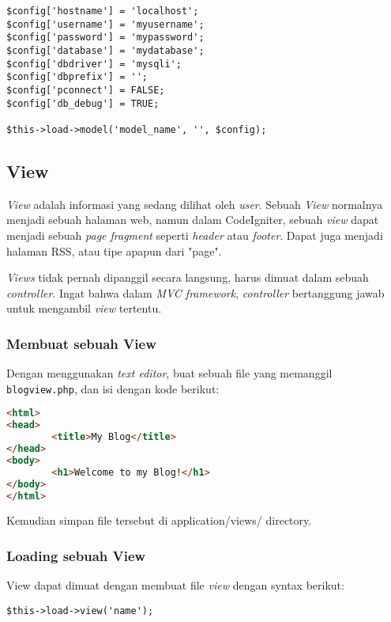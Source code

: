 \begin{enumerate}
\begin{lstlisting}[label=phpheg, frame=single]
$config['hostname'] = 'localhost';
$config['username'] = 'myusername';
$config['password'] = 'mypassword';
$config['database'] = 'mydatabase';
$config['dbdriver'] = 'mysqli';
$config['dbprefix'] = '';
$config['pconnect'] = FALSE;
$config['db_debug'] = TRUE;

$this->load->model('model_name', '', $config);
\end{lstlisting}


\subsection{View}
\label{subs:view}
\textit{View} adalah informasi yang sedang dilihat oleh \textit{user}. Sebuah \textit{View} normalnya menjadi sebuah halaman web, namun dalam CodeIgniter, sebuah \textit{view} dapat menjadi sebuah \textit{page fragment} seperti \textit{header} atau \textit{footer}. Dapat juga menjadi halaman RSS, atau tipe apapun dari "page".

\textit{Views} tidak pernah dipanggil secara langsung, harus dimuat dalam sebuah \textit{controller}. Ingat bahwa dalam \textit{MVC framework}, \textit{controller} bertanggung jawab untuk mengambil \textit{view} tertentu.\cite{codeigniter:17} 

\subsubsection{Membuat sebuah View}
\label{sssec:view_1}
Dengan menggunakan \textit{text editor}, buat sebuah file yang memanggil \verb|blogview.php|, dan isi dengan kode berikut:\cite{codeigniter:17}
\begin{lstlisting}[frame=single, language=html]% 
<html>
<head>
        <title>My Blog</title>
</head>
<body>
        <h1>Welcome to my Blog!</h1>
</body>
</html>
\end{lstlisting}

Kemudian simpan file tersebut di application/views/ directory.

\subsubsection{Loading sebuah View}
\label{sssec:view_1}

View dapat dimuat dengan membuat file \textit{view} dengan syntax berikut:

\begin{lstlisting}[frame=single] 
$this->load->view('name');
\end{lstlisting}


\end{enumerate}
